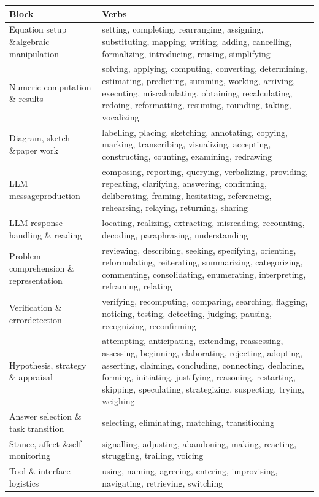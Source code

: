 \begin{ctable}
    \footnotesize
    \begin{tabularx}{\textwidth}{p{3.8cm} X}
        \toprule
        \textbf{Block} & \textbf{Verbs} \\
        \midrule
        Equation setup \&\linebreak algebraic manipulation & setting, completing, rearranging, assigning, substituting, mapping, writing, adding, cancelling, formalizing, introducing, reusing, simplifying \\
        Numeric computation \& results & solving, applying, computing, converting, determining, estimating, predicting, summing, working, arriving, executing, miscalculating, obtaining, recalculating, redoing, reformatting, resuming, rounding, taking, vocalizing \\
        Diagram, sketch \&\linebreak paper work & labelling, placing, sketching, annotating, copying, marking, transcribing, visualizing, accepting, constructing, counting, examining, redrawing \\
        \ac{LLM} message\linebreak production & composing, reporting, querying, verbalizing, providing, repeating, clarifying, answering, confirming, deliberating, framing, hesitating, referencing, rehearsing, relaying, returning, sharing \\
        \ac{LLM} response handling \& reading & locating, realizing, extracting, misreading, recounting, decoding, paraphrasing, understanding \\
        Problem comprehension \& representation & reviewing, describing, seeking, specifying, orienting, reformulating, reiterating, summarizing, categorizing, commenting, consolidating, enumerating, interpreting, reframing, relating \\
        Verification \& error\linebreak detection & verifying, recomputing, comparing, searching, flagging, noticing, testing, detecting, judging, pausing, recognizing, reconfirming \\
        Hypothesis, strategy \& appraisal & attempting, anticipating, extending, reassessing, assessing, beginning, elaborating, rejecting, adopting, asserting, claiming, concluding, connecting, declaring, forming, initiating, justifying, reasoning, restarting, skipping, speculating, strategizing, suspecting, trying, weighing \\
        Answer selection \& task transition & selecting, eliminating, matching, transitioning \\
        Stance, affect \&\linebreak self-monitoring & signalling, adjusting, abandoning, making, reacting, struggling, trailing, voicing \\
        Tool \& interface logistics & using, naming, agreeing, entering, improvising, navigating, retrieving, switching \\
        \bottomrule
    \end{tabularx}
\end{ctable}

